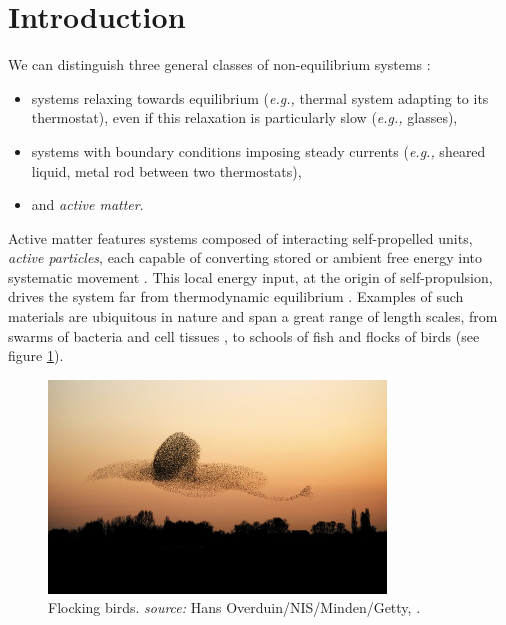 \documentclass[class=report, float=false, crop=false]{standalone}
\begin{document}
\chapter*{Introduction}
\label{introduction}

We can distinguish three general classes of non-equilibrium systems \cite{cates2015motility}:
\begin{itemize}
  \item systems relaxing towards equilibrium (\textit{e.g.,} thermal system adapting to its thermostat), even if this relaxation is particularly slow (\textit{e.g.,} glasses),
  \item systems with boundary conditions imposing steady currents (\textit{e.g.,} sheared liquid, metal rod between two thermostats),
  \item and \textit{active matter}.
\end{itemize}
Active matter features systems composed of interacting self-propelled units, \textit{active particles}, each capable of converting stored or ambient free energy into systematic movement \cite{marchetti2013hydrodynamics}. This local energy input, at the origin of self-propulsion, drives the system far from thermodynamic equilibrium \cite{levis2014clustering}. Examples of such materials are ubiquitous in nature and span a great range of length scales, from swarms of bacteria \cite{dombrowski2004self} and cell tissues \cite{angelini2011glass}, to schools of fish \cite{calovi2014swarming} and flocks of birds \cite{cavagna2014bird} (see figure \ref{birds}).\\

\begin{figure}[h!]
\centering
\includegraphics[width=0.8\textwidth]{birds}
\caption{Flocking birds. \textit{source:} Hans Overduin/NIS/Minden/Getty, \cite{popkin2016physics}.}
\label{birds}
\end{figure}
\end{document}
